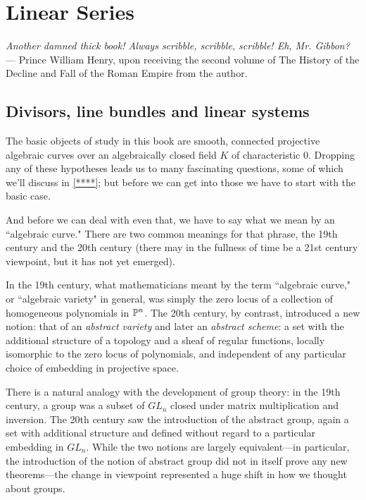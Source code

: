 


\chapter{Linear Series}

\begin{center}
\emph{Another damned thick book! Always scribble, scribble, scribble! Eh, Mr. Gibbon?} --- \scriptsize{Prince William Henry, upon receiving the second  volume of The History of the Decline and Fall of the Roman Empire from the author.}
\end{center}



\section{Divisors, line bundles and linear systems}


The basic objects of study in this book are smooth, connected projective algebraic curves over an algebraically closed field $K$ of characteristic 0. Dropping any of these hypotheses leads us to many fascinating questions, some of which we'll discuss in \ref{****}; but before we can get into those we have to start with the basic case.

And before we can deal with even that, we have to say what we mean by an ``algebraic curve." There are two common meanings for that phrase, the 19th century and the 20th century (there may in the fullness of time be a 21st century viewpoint, but it has not yet emerged). 

In the 19th century, what mathematicians meant by the term ``algebraic curve," or ``algebraic variety" in general, was simply the zero locus of a collection of homogeneous polynomials in $\PP^n$. The 20th century, by contrast, introduced a new notion: that of an \emph{abstract variety} and later an \emph{abstract scheme}: a set with the additional structure of a topology and a sheaf of regular functions, locally isomorphic to the zero locus of polynomials, and independent of any particular choice of embedding in projective space.

There is a natural analogy with the development of group theory: in the 19th century, a group was a subset of $GL_n$ closed under matrix multiplication and inversion. The 20th century saw the introduction of the abstract group, again a set with additional structure and defined without regard to a particular embedding in $GL_n$. While the two notions are largely equivalent---in particular, the introduction of the notion of abstract group did not in itself prove any new theorems---the change in viewpoint represented a huge shift in how we thought about groups.

